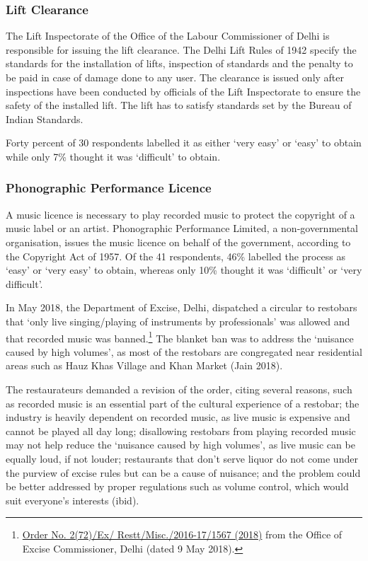 \documentclass[a4paper, 12pt]{article}
\begin{document}
		\subsubsection{Lift Clearance}
		The Lift Inspectorate of the Office of the Labour Commissioner of Delhi is responsible for issuing the lift clearance. The Delhi Lift Rules of 1942 specify the standards for the installation of lifts, inspection of standards and the penalty to be paid in case of 
damage done to any user. The clearance is issued only after inspections have been conducted by officials of the Lift Inspectorate to ensure the safety of the installed lift. The lift has to satisfy standards set by the Bureau of Indian Standards.
		
		Forty percent of 30 respondents labelled it as either ‘very easy’ or ‘easy’ to obtain while only 7\% thought it was ‘difficult’ to obtain. %
		
		
		\subsubsection{Phonographic Performance Licence}
		A music licence is necessary to play recorded music to protect the copyright of a music label or an artist. Phonographic Performance Limited, a non-governmental organisation, issues the music licence on behalf of the government, according to the 
Copyright Act of 1957. Of the 41 respondents, 46\% labelled the process as ‘easy’ or ‘very easy’ to obtain, whereas only 10\% thought it was ‘difficult’ or ‘very difficult’.
		
		In May 2018, the Department of Excise, Delhi, dispatched a circular to restobars that ‘only live singing/playing of instruments by professionals’ was allowed and that recorded music was banned.\footnote{\href{https://bit.ly/2MzCM02} {Order No. 2(72)/Ex/
Restt/Misc./2016-17/1567 (2018)} from the Office of Excise Commissioner, Delhi (dated 9 May 2018).} The blanket ban was to address the ‘nuisance caused by high volumes’, as most of the restobars are congregated near residential areas such as Hauz Khas 
Village and Khan Market (Jain 2018).
		
		The restaurateurs demanded a revision of the order, citing several reasons, such as recorded music is an essential part of the cultural experience of a restobar; the industry is heavily dependent on recorded music, as live music is expensive and cannot 
be played all day long; disallowing restobars from playing recorded music may not help reduce the ‘nuisance caused by high volumes’, as live music can be equally loud, if not louder; restaurants that don’t serve liquor do not come under the purview of excise rules 
but can be a cause of nuisance; and the problem could be better addressed by proper regulations such as volume control, which would suit everyone’s interests (ibid).
		
\end{document}
